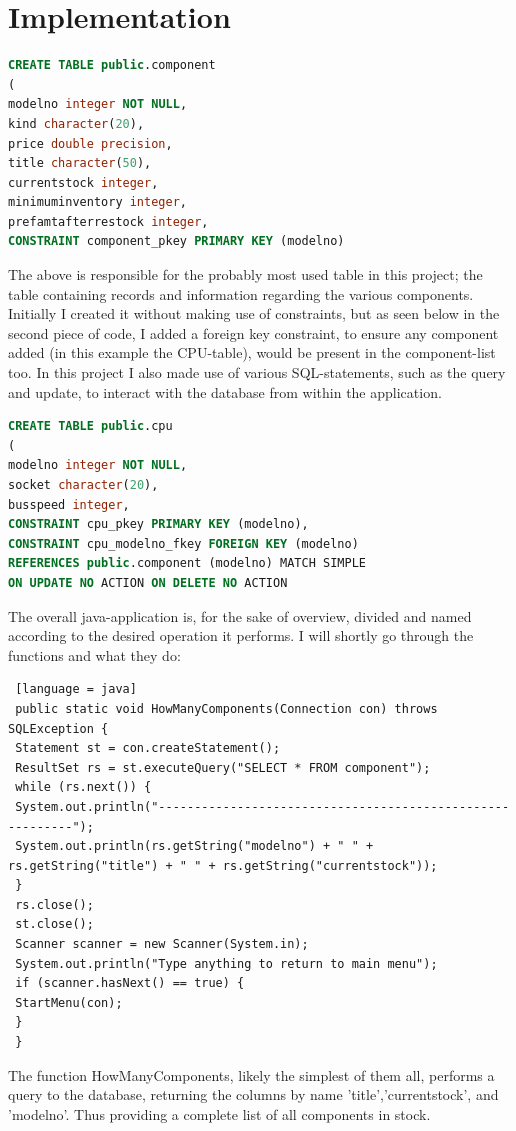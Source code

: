 \documentclass[a4paper,10pt]{article}
\begin{document}
\section{Implementation}
\begin{lstlisting}[language=SQL]
CREATE TABLE public.component
(
modelno integer NOT NULL,
kind character(20),
price double precision,
title character(50),
currentstock integer,
minimuminventory integer,
prefamtafterrestock integer,
CONSTRAINT component_pkey PRIMARY KEY (modelno)
\end{lstlisting}
The above is responsible for the probably most used table in this project; the table containing records and information regarding the various components. Initially I created it without making use of constraints, but as seen below in the second piece of code, I added a foreign key constraint, to ensure any component added (in this example the CPU-table), would be present in the component-list too. In this project I also made use of various SQL-statements, such as the query and update, to interact with the database from within the application.  
\begin{lstlisting}[language=SQL]
CREATE TABLE public.cpu
(
modelno integer NOT NULL,
socket character(20),
busspeed integer,
CONSTRAINT cpu_pkey PRIMARY KEY (modelno),
CONSTRAINT cpu_modelno_fkey FOREIGN KEY (modelno)
REFERENCES public.component (modelno) MATCH SIMPLE
ON UPDATE NO ACTION ON DELETE NO ACTION
\end{lstlisting}

The overall java-application is, for the sake of overview, divided and named according to the desired operation it performs. I will shortly go through the functions and what they do: 

\begin{lstlisting} [language = java]
 public static void HowManyComponents(Connection con) throws SQLException {
 Statement st = con.createStatement();
 ResultSet rs = st.executeQuery("SELECT * FROM component");
 while (rs.next()) {
 System.out.println("----------------------------------------------------------");
 System.out.println(rs.getString("modelno") + " " + rs.getString("title") + " " + rs.getString("currentstock"));
 }
 rs.close();
 st.close();
 Scanner scanner = new Scanner(System.in);
 System.out.println("Type anything to return to main menu");
 if (scanner.hasNext() == true) {
 StartMenu(con);
 }
 }
\end{lstlisting}
The function HowManyComponents, likely the simplest of them all, performs a query to the database, returning the columns by name 'title','currentstock', and 'modelno'. Thus providing a complete list of all components in stock.
\end{document}
